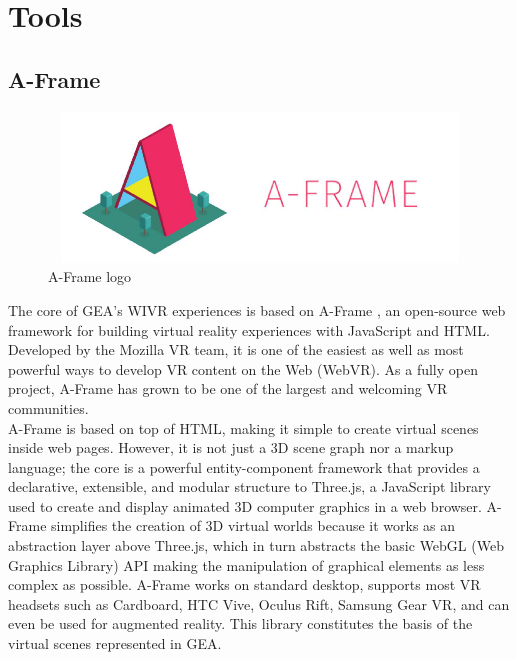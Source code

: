 \section{Tools}
\subsection{A-Frame}
\begin{figure}[H]
\centering
\includegraphics[width=12cm, height=4cm]{immagini/aframe.png}
\caption{A-Frame logo}\label{fig:logoframe}
\end{figure}
The core of GEA's WIVR experiences is based on A-Frame \cite{Aframe}, an open-source web framework for building virtual reality experiences with JavaScript and HTML. Developed by the Mozilla VR team, it is one of the easiest as well as most powerful ways to develop VR content on the Web (WebVR). As a fully open project, A-Frame has grown to be one of the largest and welcoming VR communities.\\
A-Frame is based on top of HTML, making it simple to create virtual scenes inside web pages. However, it is not just a 3D scene graph nor a markup language; the core is a powerful entity-component framework that provides a declarative, extensible, and modular structure to Three.js, a JavaScript library used to create and display animated 3D computer graphics in a web browser. A-Frame simplifies the creation of 3D virtual worlds because it works as an abstraction layer above Three.js, which in turn abstracts the basic WebGL (Web Graphics Library) API making the manipulation of graphical elements as less complex as possible.
A-Frame works on standard desktop, supports most VR headsets such as Cardboard, HTC Vive, Oculus Rift, Samsung Gear VR, and can even be used for augmented reality. This library constitutes the basis of the virtual scenes represented in GEA.

